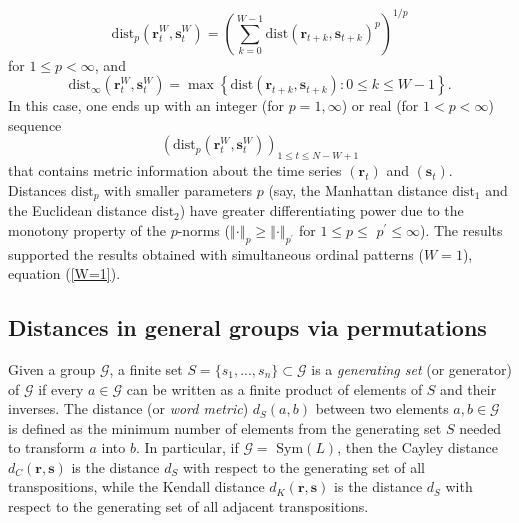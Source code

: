 \documentclass[%
 aip,
 amsmath,amssymb,
 reprint,%
]{revtex4-1}
\begin{document}
\begin{equation}
\mathrm{dist}_{p}(\mathbf{r}_{t}^{W},\mathbf{s}_{t}^{W})=\left(
\sum_{k=0}^{W-1}\mathrm{dist}(\mathbf{r}_{t+k},\mathbf{s}_{t+k})^{p}\right)
^{1/p}  \label{l_p dist}
\end{equation}%
for $1\leq p<\infty $, and%
\begin{equation}
\mathrm{dist}_{\infty }(\mathbf{r}_{t}^{W},\mathbf{s}_{t}^{W})=\max \left\{ 
\mathrm{dist}(\mathbf{r}_{t+k},\mathbf{s}_{t+k}):0\leq k\leq W-1\right\} .
\label{Chebyshev dist}
\end{equation}%
In this case, one ends up with an integer (for $p=1,\infty $) or real (for $%
1<p<\infty $) sequence%
\begin{equation}
(\mathrm{dist}_{p}(\mathbf{r}_{t}^{W},\mathbf{s}_{t}^{W}))_{1\leq t\leq
N-W+1}  \label{dist_p TS}
\end{equation}%
that contains metric information about the time series $(\mathbf{r}_{t})$
and $(\mathbf{s}_{t})$. Distances $\mathrm{dist}_{p}$ with smaller
parameters $p$ (say, the Manhattan distance $\mathrm{dist}_{1}$ and the
Euclidean distance $\mathrm{dist}_{2}$) have greater differentiating
power due to the monotony property of the $p$-norms ($\left\Vert \cdot
\right\Vert _{p}\geq \left\Vert \cdot \right\Vert _{p^{\prime }}$ for $1\leq
p\leq $ $p^{\prime }\leq \infty $). The results supported the results
obtained with simultaneous ordinal patterns ($W=1$), equation (\ref{W=1}).


\subsection{Distances in general groups via permutations}

\label{sec62}

Given a group $\mathcal{G}$, a finite set $S=\{s_{1},...,s_{n}\}\subset 
\mathcal{G}$ is a \textit{generating set} (or generator) of $\mathcal{G}$ if
every $a\in \mathcal{G}$ can be written as a finite product of elements of $%
S $ and their inverses. The distance (or \textit{word metric}) $d_{S}(a,b)$
between two elements $a,b\in \mathcal{G}$ is defined \cite{Herstein1996} as
the minimum number of elements from the generating set $S$ needed to
transform $a$ into $b$. In particular, if $\mathcal{G}=$ $\mathrm{Sym}(L)$,
then the Cayley distance $d_{C}(\mathbf{r},\mathbf{s})$ is the distance $%
d_{S}$ with respect to the generating set of all transpositions, while the
Kendall distance $d_{K}(\mathbf{r},\mathbf{s})$ is the distance $d_{S}$ with
respect to the generating set of all adjacent transpositions.
\end{document}
